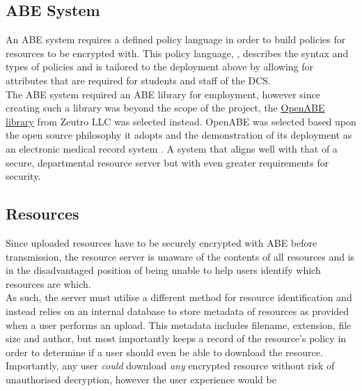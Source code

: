 \subsection{ABE System}
\label{subsec:design_abe_sys}

An ABE system requires a defined policy language in order to build policies for resources to be encrypted with. This policy language, \thePolicyLang, describes the syntax and types of policies and is tailored to the deployment above by allowing for attributes that are required for students and staff of the DCS.\\
The ABE system required an ABE library for employment, however since creating such a library was beyond the scope of the project, the \href{https://github.com/zeutro/openabe}{OpenABE library} from Zeutro LLC was selected instead. OpenABE was selected based upon the open source philosophy it adopts and the demonstration of its deployment as an electronic medical record system \citet{Akinyele2011}. A system that aligns well with that of a secure, departmental resource server but with even greater requirements for security.

\subsection{Resources}
\label{subsec:design_resources}

Since uploaded resources have to be securely encrypted with ABE before transmission, the resource server is unaware of the contents of all resources and is in the disadvantaged position of being unable to help users identify which resources are which.\\
As such, the server must utilise a different method for resource identification and instead relies on an internal database to store metadata of resources as provided when a user performs an upload. This metadata includes filename, extension, file size and author, but most importantly keeps a record of the resource's policy in order to determine if a user should even be able to download the resource.\\
Importantly, any user \textit{could} download \textit{any} encrypted resource without risk of unauthorised decryption, however the user experience would be
